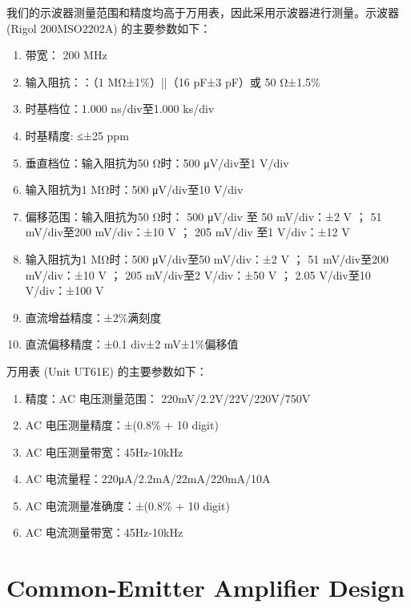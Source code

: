 \documentclass[UTF8]{article}
\begin{document}
我们的示波器测量范围和精度均高于万用表，因此采用示波器进行测量。示波器 (Rigol 200MSO2202A) 的主要参数如下：
\begin{enumerate}
    \item 带宽： 200 MHz
    \item 输入阻抗：：（1 MΩ±1\%）||（16 pF±3 pF）或 50 Ω±1.5\%
    \item 时基档位：1.000 ns/div至1.000 ks/div
    \item 时基精度: ≤±25 ppm
    \item 垂直档位：输入阻抗为50 Ω时：500 μV/div至1 V/div
    \item 输入阻抗为1 MΩ时：500 μV/div至10 V/div
    \item 偏移范围：输入阻抗为50 Ω时： 500 μV/div 至 50 mV/div：±2 V ； 51 mV/div至200 mV/div：±10 V ； 205 mV/div 至1 V/div：±12 V
    \item 输入阻抗为1 MΩ时：500 μV/div至50 mV/div：±2 V ； 51 mV/div至200 mV/div：±10 V ； 205 mV/div至2 V/div：±50 V ； 2.05 V/div至10 V/div：±100 V
    \item 直流增益精度：±2\%满刻度
    \item 直流偏移精度：±0.1 div±2 mV±1\%偏移值
\end{enumerate}

\noindent 万用表 (Unit UT61E) 的主要参数如下：
\begin{enumerate}
    \item 精度：AC 电压测量范围： 220mV/2.2V/22V/220V/750V
    \item AC 电压测量精度：±(0.8\% + 10 digit)
    \item AC 电压测量带宽：45Hz-10kHz
    \item AC 电流量程：220μA/2.2mA/22mA/220mA/10A
    \item AC 电流测量准确度：±(0.8\% + 10 digit)
    \item AC 电流测量带宽：45Hz-10kHz
\end{enumerate}



\section{Common-Emitter Amplifier Design}
\end{document}
